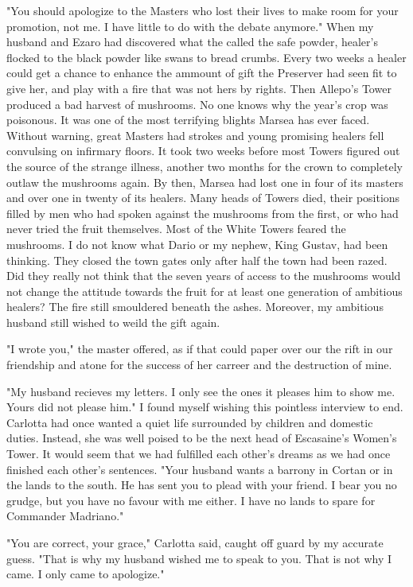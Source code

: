 \documentclass{article}
\begin{document}
"You should apologize to the Masters who lost their lives to make room for your promotion, not me. I have little to do with the debate anymore." When my husband and Ezaro had discovered what the called the safe powder, healer's flocked to the black powder like swans to bread crumbs. Every two weeks a healer could get a chance to enhance the ammount of gift the Preserver had seen fit to give her, and play with a fire that was not hers by rights. Then Allepo's Tower produced a bad harvest of mushrooms. No one knows why the year's crop was poisonous. It was one of the most terrifying blights Marsea has ever faced. Without warning, great Masters had strokes and young promising healers fell convulsing on infirmary floors. It took two weeks before most Towers figured out the source of the strange illness, another two months for the crown to completely outlaw the mushrooms again. By then, Marsea had lost one in four of its masters and over one in twenty of its healers. Many heads of Towers died, their positions filled by men who had spoken against the mushrooms from the first, or who had never tried the fruit themselves.  Most of the White Towers feared the mushrooms. I do not know what Dario or my nephew, King Gustav, had been thinking. They closed the town gates only after half the town had been razed. Did they really not think that the seven years of access to the mushrooms would not change the attitude towards the fruit for at least one generation of ambitious healers? The fire still smouldered beneath the ashes. Moreover, my ambitious husband still wished to weild the gift again.

"I wrote you," the master offered, as if that could paper over our the rift in our friendship and atone for the success of her carreer and the destruction of mine.

"My husband recieves my letters. I only see the ones it pleases him to show me. Yours did not please him." I found myself wishing this pointless interview to end. Carlotta had once wanted a quiet life surrounded by children and domestic duties. Instead, she was well poised to be the next head of Escasaine's Women's Tower. It would seem that we had fulfilled each other's dreams as we had once finished each other's sentences. "Your husband wants a barrony in Cortan or in the lands to the south. He has sent you to plead with your friend. I bear you no grudge, but you have no favour with me either. I have no lands to spare for Commander Madriano." 

"You are correct, your grace," Carlotta said, caught off guard by my accurate guess. "That is why my husband wished me to speak to you. That is not why I came. I only came to apologize."
\end{document}
